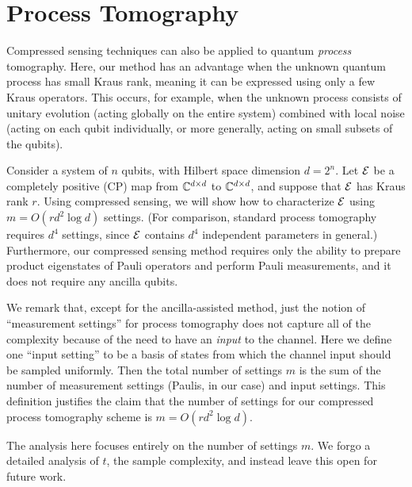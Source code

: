 

\section{Process Tomography}\label{S:process}


Compressed sensing techniques can also be applied to quantum \textit{process} tomography.  Here, our method has an advantage when the unknown quantum process has small Kraus rank, meaning it can be expressed using only a few Kraus operators.  This occurs, for example, when the unknown process consists of unitary evolution (acting globally on the entire system) combined with local noise (acting on each qubit individually, or more generally, acting on small subsets of the qubits).

Consider a system of $n$ qubits, with Hilbert space dimension $d = 2^n$.  Let $\mathcal{E}$ be a completely positive (CP) map from $\mathbb{C}^{d\times d}$ to $\mathbb{C}^{d\times d}$, and suppose that $\mathcal{E}$ has Kraus rank $r$.  Using compressed sensing, we will show how to characterize $\mathcal{E}$ using $m = O(r d^2 \log d)$ settings.  (For comparison, standard process tomography requires $d^4$ settings, since $\mathcal{E}$ contains $d^4$ independent parameters in general.)  Furthermore, our compressed sensing method requires only the ability to prepare product eigenstates of Pauli operators and perform Pauli measurements, and it does not require any ancilla qubits.

We remark that, except for the ancilla-assisted method, just the notion of ``measurement settings'' for process tomography does not capture all of the complexity because of the need to have an \emph{input} to the channel. Here we define one ``input setting'' to be a basis of states from which the channel input should be sampled uniformly. Then the total number of settings $m$ is the sum of the number of measurement settings (Paulis, in our case) and input settings. This definition justifies the claim that the number of settings for our compressed process tomography scheme is $m = O(rd^2 \log d)$. 

The analysis here focuses entirely on the number of settings $m$. We forgo a detailed analysis of $t$, the sample complexity, and instead leave this open for future work.

